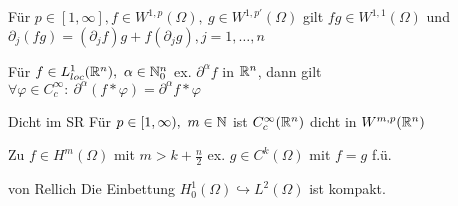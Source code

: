 \begin{bemerkung}
    Für \(p\in [1,\infty], f\in W^{1,p}(\Omega),\ 
    g\in W^{1,p'}(\Omega)\) gilt \(fg\in W^{1,1}(\Omega)\) und
    \(\partial_j(fg)= (\partial_jf)g + f(\partial_jg), j=1,\dots,n\)
\end{bemerkung}

\begin{bemerkung}
    Für \(f\in L_{loc}^1(\mathbb{R}^n),\ \alpha \in \mathbb{N}_0^n\) ex.
    \(\partial^\alpha f\) in \(\mathbb{R}^n\), dann gilt
    \(\forall\varphi\in C_c^\infty:\ \partial^\alpha(f\ast \varphi) = 
    \partial^\alpha f \ast \varphi\) 
\end{bemerkung}

\begin{satz}{Dicht im SR}
    Für \(p\in [1,\infty),\ m\in\mathbb{N}\) ist \(C_c^\infty(\mathbb{R}^n)\) dicht in
    \(W^{m,p}(\mathbb{R}^n)\)
\end{satz}

\begin{lemma}
    Zu \(f\in H^m(\Omega)\) mit \(m > k+\frac{n}{2}\) ex.
    \(g\in C^k(\Omega)\) mit \(f=g\) f.ü.
\end{lemma}

\begin{satz}{von Rellich}
    Die Einbettung \(H_0^1(\Omega) \hookrightarrow L^2(\Omega)\) ist kompakt.
\end{satz}